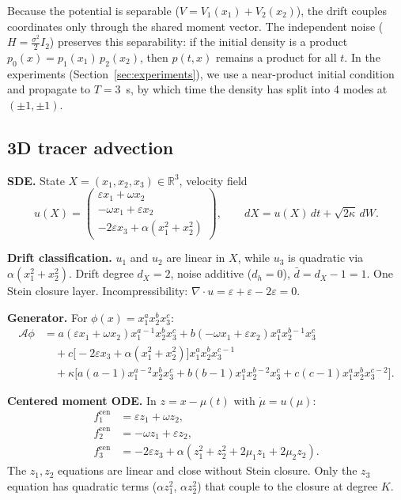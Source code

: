 \documentclass{article}
\newcommand{\R}{\mathbb{R}}
\theoremstyle{definition}
\begin{document}
Because the potential is separable ($V = V_1(x_1) + V_2(x_2)$),
the drift couples coordinates only through the shared moment vector.
The independent noise ($H = \frac{\sigma^2}{2}I_2$) preserves
this separability: if the initial density is a product
$p_0(x) = p_1(x_1)\,p_2(x_2)$, then $p(t,x)$ remains a product
for all $t$.
In the experiments (Section~\ref{sec:experiments}),
we use a near-product initial condition and propagate
to $T = 3$~s, by which time the density has split into 4 modes
at $(\pm 1, \pm 1)$.

\subsection{3D tracer advection}
\label{app:generator-fluid}

\textbf{SDE.}
State $X = (x_1, x_2, x_3) \in \R^3$, velocity field
\begin{equation}
    u(X) = \begin{pmatrix}
        \varepsilon x_1 + \omega x_2 \\
        -\omega x_1 + \varepsilon x_2 \\
        -2\varepsilon x_3 + \alpha(x_1^2 + x_2^2)
    \end{pmatrix}, \qquad
    dX = u(X)\,dt + \sqrt{2\kappa}\,dW.
\end{equation}

\textbf{Drift classification.}
$u_1$ and $u_2$ are linear in $X$, while $u_3$ is quadratic via
$\alpha(x_1^2 + x_2^2)$.
Drift degree $d_X = 2$, noise additive ($d_h = 0$),
$\bar{d} = d_X - 1 = 1$.
One Stein closure layer.
Incompressibility: $\nabla \cdot u = \varepsilon + \varepsilon - 2\varepsilon = 0$.

\textbf{Generator.}
For $\phi(x) = x_1^a x_2^b x_3^c$:
\begin{align}
    \mathcal{A}\phi &= a(\varepsilon x_1 + \omega x_2)x_1^{a-1}x_2^b x_3^c
    + b(-\omega x_1 + \varepsilon x_2)x_1^a x_2^{b-1}x_3^c
    \nonumber\\
    &\quad + c\bigl[-2\varepsilon x_3 + \alpha(x_1^2{+}x_2^2)\bigr]
    x_1^a x_2^b x_3^{c-1}
    \nonumber\\
    &\quad + \kappa\bigl[a(a{-}1)x_1^{a-2}x_2^b x_3^c
    + b(b{-}1)x_1^a x_2^{b-2}x_3^c
    + c(c{-}1)x_1^a x_2^b x_3^{c-2}\bigr].
\end{align}

\textbf{Centered moment ODE.}
In $z = x - \mu(t)$ with $\dot{\mu} = u(\mu)$:
\begin{align}
    f_1^{\text{cen}} &= \varepsilon z_1 + \omega z_2, \nonumber\\
    f_2^{\text{cen}} &= -\omega z_1 + \varepsilon z_2, \nonumber\\
    f_3^{\text{cen}} &= -2\varepsilon z_3 + \alpha(z_1^2 + z_2^2
    + 2\mu_1 z_1 + 2\mu_2 z_2).
\end{align}
The $z_1, z_2$ equations are linear and close without Stein closure.
Only the $z_3$ equation has quadratic terms ($\alpha z_1^2$, $\alpha z_2^2$)
that couple to the closure at degree $K$.
\end{document}
